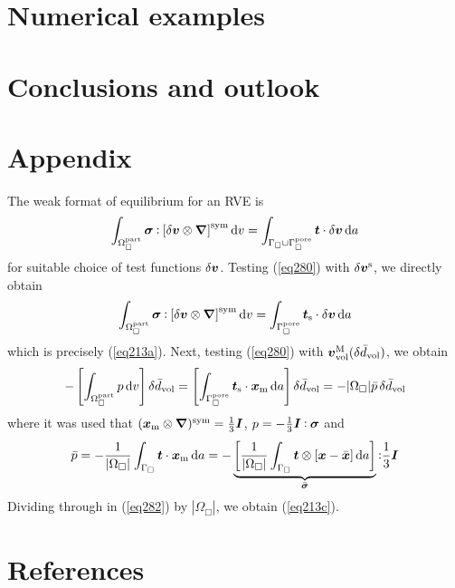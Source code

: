 \documentclass[10pt,a4paper]{article}
\newcommand{\fluid}{\mathrm{part}}
\newcommand{\pore}{\mathrm{pore}}
\newcommand{\surf}{\mathrm{s}}
\begin{document}
\section{Numerical examples}\label{sec:examples}

\section{Conclusions and outlook}\label{sec:conlusions}

\section{Appendix}

The weak format of equilibrium for an RVE is
\begin{equation}
    \int_{\Omega^\fluid_\Box} \ts{\sigma} \dprod \left[\delta \ta{v}\outerp\diff\right]^\sym \dif v =
    \int_{\Gamma_\Box\cup\Gamma_\Box^\pore} \ta{t} \cdot \delta\ta{v} \dif a
\label{eq280}
\end{equation}
for suitable choice of test functions $\delta \boldsymbol{v}$. Testing (\ref{eq280}) with $\delta \boldsymbol{v}^{\mathrm{s}}$, we directly obtain
\begin{equation}
    \int_{\Omega^\fluid_\Box} \ts{\sigma} \dprod \left[\delta \ta{v}\outerp\diff\right]^\sym \dif v =
    \int_{\Gamma_\Box^\pore} \ta{t}_\surf \cdot \delta\ta{v} \dif a
\label{eq281}
\end{equation}
which is precisely (\ref{eq213a}). Next, testing (\ref{eq280}) with $\boldsymbol{v}^{\mathrm{M}}_{\mathrm{vol}}(\delta\bar{d}_{\mathrm{vol}})$, we obtain 
\begin{equation}
    - \left[\int_{\Omega^\fluid_\Box} p  \dif v \right]\delta\bar{d}_\vol =
    \left[\int_{\Gamma_\Box^\pore} \ta{t}_\surf \cdot \ta{x}_\mean \dif a\right]\delta\bar{d}_\vol =
    - |\Omega_\Box|\bar{p}\,\delta\bar{d}_\vol
\label{eq282}
\end{equation}
where it was used that $(\boldsymbol{x}_{\mathrm{m}}\mathbin{\otimes}\boldsymbol{\nabla})^{\mathrm{sym}}=\frac{1}{3}\boldsymbol{I}$, $p=-\frac{1}{3}\boldsymbol{I}\mathbin{\vcentcolon}\boldsymbol{\sigma}$ and 
\begin{equation}
    \bar{p} = - \frac{1}{|\Omega_\Box|} \int_{\Gamma_\Box} \boldsymbol{t} \cdot \boldsymbol{x}_{\mathrm{m}} \operatorname{d \!} a =
     - \underbrace{\left[\frac{1}{|\Omega_\Box|} \int_{\Gamma_\Box} \boldsymbol{t} \mathbin{\otimes} [\boldsymbol{x}-\bar{\boldsymbol{x}}] \operatorname{d \!} a\right]}_{\bar{\boldsymbol{\sigma}}}  \mathbin{\vcentcolon} \frac{1}{3}\boldsymbol{I}
\label{eq282}
\end{equation}
Dividing through in (\ref{eq282}) by $|\Omega_\Box|$, we obtain (\ref{eq213c}).


\section{References}



\end{document}
